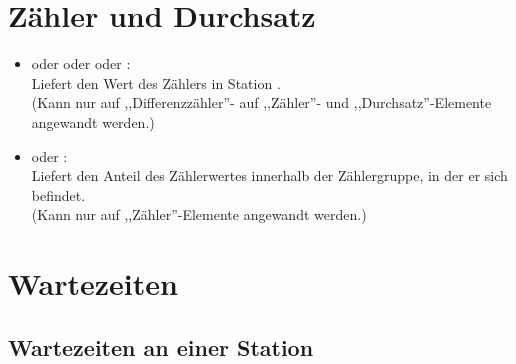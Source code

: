 \section{Zähler und Durchsatz}

\begin{itemize}

\item
{} oder  oder  oder :\\
Liefert den Wert des Zählers in Station .\\
(Kann nur auf ,,Differenzzähler''- auf ,,Zähler''- und ,,Durchsatz''-Elemente angewandt werden.)

\item
{} oder :\\
Liefert den Anteil des Zählerwertes innerhalb der Zählergruppe, in der er sich befindet.\\
(Kann nur auf ,,Zähler''-Elemente angewandt werden.)

\end{itemize}  



\section{Wartezeiten}



\subsection{Wartezeiten an einer Station}

